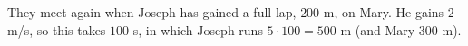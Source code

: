 They meet again when Joseph has gained a full lap, $200$ m, on Mary. He gains $2$ m/s, so this takes $100$ s, in which Joseph runs $5\cdot100=\boxed{500\text{ m}}$ (and Mary $300$ m).
